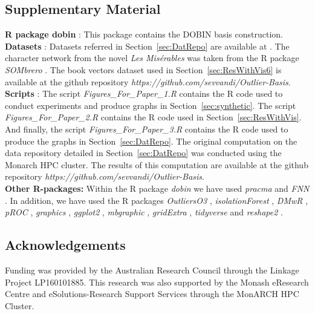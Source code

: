 \documentclass[a4paper,11pt]{article}
\begin{document}
\subsection*{Supplementary Material}
{\bf R package dobin} : This package contains the DOBIN basis construction.  \\
{\bf Datasets} : Datasets referred in Section~\ref{sec:DatRepo} are available at \cite{datasets}. The character network from the novel \textit{Les Mis\'erables} was taken from the R package \textit{SOMbrero} \citep{sombrero}. The book vectors dataset used in Section~\ref{sec:ResWithVis6} is available at the github repository \textit{https://github.com/sevvandi/Outlier-Basis}. \\
{\bf Scripts }: The script \textit{Figures\_For\_Paper\_1.R} contains the R code used to conduct experiments and produce graphs in Section~\ref{sec:synthetic}. The script  \textit{Figures\_For\_Paper\_2.R} contains the R code used in  Section~\ref{sec:ResWithVis}. And finally, the script  \textit{Figures\_For\_Paper\_3.R} contains the R code used to produce the graphs in Section~\ref{sec:DatRepo}.  The original  computation on the data repository detailed in Section~\ref{sec:DatRepo} was conducted using the Monarch HPC cluster. The results of this computation are available at the github repository \textit{https://github.com/sevvandi/Outlier-Basis}. \\
{\bf Other R-packages:} Within the R package \textit{dobin} we have used \textit{pracma} \citep{pracma} and \textit{FNN} \citep{FNN}. In addition, we have used the R packages \textit{OutliersO3} \citep{O3Rpack}, \textit{isolationForest}  \citep{isolationForest}, \textit{DMwR} \citep{DMwR}, \textit{pROC} \citep{pROC}, \textit{graphics} \citep{graphics}, \textit{ggplot2} \citep{ggplot2}, \textit{mbgraphic} \citep{mbgraphic}, \textit{gridExtra} \citep{gridextra}, \textit{tidyverse} \citep{tidyverse} and \textit{reshape2} \citep{reshape2}.



\subsection*{Acknowledgements}

Funding was provided by the Australian Research Council through the Linkage Project LP160101885. This research was also supported by the Monash eResearch Centre and eSolutions-Research Support Services through the MonARCH HPC Cluster.


\footnotesize

\end{document}
